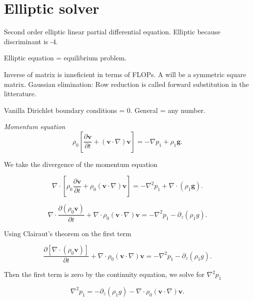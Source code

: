 \documentclass{article}
\begin{document}
\section{Elliptic solver}

Second order elliptic linear partial differential equation. Elliptic because discriminant is -4.


Elliptic equation = equilibrium problem.

Inverse of matrix is inneficient in terms of FLOPs. A will be a symmetric square matrix.
Gaussian elimination: Row reduction is called forward substitution in the litterature.

Vanilla Dirichlet boundary conditions = 0. General = any number.

\textit{Momentum equation}
\begin{equation}\label{eq:momentum_full}
    \rho_0\left[\frac{\partial\mathbf{v}}{\partial t}+(\mathbf{v}\cdot\nabla)\mathbf{v}\right]=-\nabla p_1 + \rho_1\mathbf{g}.
\end{equation}

We take the divergence of the momentum equation

\begin{equation}
    \nabla\cdot \left[\rho_0\frac{\partial\mathbf{v}}{\partial t}+\rho_0(\mathbf{v}\cdot\nabla)\mathbf{v}\right]=-\nabla^2 p_1 + \nabla\cdot\left(\rho_1\mathbf{g}\right).
\end{equation}

\begin{equation}
     \nabla\cdot\frac{\partial\left(\rho_0\mathbf{v}\right)}{\partial t}+\nabla\cdot\rho_0(\mathbf{v}\cdot\nabla)\mathbf{v}=-\nabla^2 p_1 - \partial_z\left(\rho_1 g\right).
\end{equation}

Using Clairaut's theorem on the first term

\begin{equation}
    \frac{\partial\left[\nabla\cdot\left(\rho_0\mathbf{v}\right)\right]}{\partial t}+\nabla\cdot\rho_0(\mathbf{v}\cdot\nabla)\mathbf{v}=-\nabla^2 p_1 - \partial_z\left(\rho_1 g\right).
\end{equation}

Then the first term is zero by the continuity equation, we solve for $\nabla^2 p_1$

\begin{equation}
    \nabla^2 p_1= - \partial_z\left(\rho_1 g\right) - \nabla\cdot\rho_0(\mathbf{v}\cdot\nabla)\mathbf{v}.
\end{equation}
\end{document}
